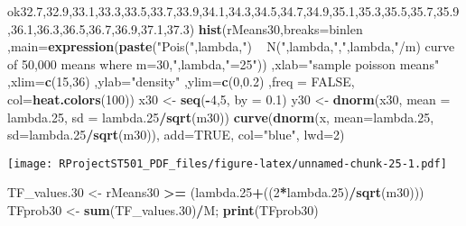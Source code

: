 \documentclass[
]{article}
\newenvironment{Shaded}{\begin{snugshade}}{\end{snugshade}}
\newcommand{\DataTypeTok}[1]{\textcolor[rgb]{0.13,0.29,0.53}{#1}}
\newcommand{\DecValTok}[1]{\textcolor[rgb]{0.00,0.00,0.81}{#1}}
\newcommand{\FloatTok}[1]{\textcolor[rgb]{0.00,0.00,0.81}{#1}}
\newcommand{\KeywordTok}[1]{\textcolor[rgb]{0.13,0.29,0.53}{\textbf{#1}}}
\newcommand{\NormalTok}[1]{#1}
\newcommand{\OperatorTok}[1]{\textcolor[rgb]{0.81,0.36,0.00}{\textbf{#1}}}
\newcommand{\OtherTok}[1]{\textcolor[rgb]{0.56,0.35,0.01}{#1}}
\newcommand{\StringTok}[1]{\textcolor[rgb]{0.31,0.60,0.02}{#1}}
\begin{document}
\begin{Shaded}
\begin{Highlighting}[]
ok{32.7}\NormalTok{,}\FloatTok{32.9}\NormalTok{,}\FloatTok{33.1}\NormalTok{,}\FloatTok{33.3}\NormalTok{,}\FloatTok{33.5}\NormalTok{,}\FloatTok{33.7}\NormalTok{,}\FloatTok{33.9}\NormalTok{,}\FloatTok{34.1}\NormalTok{,}\FloatTok{34.3}\NormalTok{,}\FloatTok{34.5}\NormalTok{,}\FloatTok{34.7}\NormalTok{,}\FloatTok{34.9}\NormalTok{,}\FloatTok{35.1}\NormalTok{,}\FloatTok{35.3}\NormalTok{,}\FloatTok{35.5}\NormalTok{,}\FloatTok{35.7}\NormalTok{,}\FloatTok{35.9}\NormalTok{,}\FloatTok{36.1}\NormalTok{,}\FloatTok{36.3}\NormalTok{,}\FloatTok{36.5}\NormalTok{,}\FloatTok{36.7}\NormalTok{,}\FloatTok{36.9}\NormalTok{,}\FloatTok{37.1}\NormalTok{,}\FloatTok{37.3}\NormalTok{)}
\KeywordTok{hist}\NormalTok{(rMeans30,}\DataTypeTok{breaks=}\NormalTok{binlen ,}\DataTypeTok{main=}\KeywordTok{expression}\NormalTok{(}\KeywordTok{paste}\NormalTok{(}\StringTok{"Pois("}\NormalTok{,lambda,}\StringTok{") ~ N("}\NormalTok{,lambda,}\StringTok{","}\NormalTok{,lambda,}\StringTok{"/m) curve of 50,000 means where m=30,"}\NormalTok{,lambda,}\StringTok{"=25"}\NormalTok{))  ,}\DataTypeTok{xlab=}\StringTok{"sample poisson means"}\NormalTok{ ,}\DataTypeTok{xlim=}\KeywordTok{c}\NormalTok{(}\DecValTok{15}\NormalTok{,}\DecValTok{36}\NormalTok{) }
\NormalTok{     ,}\DataTypeTok{ylab=}\StringTok{"density"}\NormalTok{ ,}\DataTypeTok{ylim=}\KeywordTok{c}\NormalTok{(}\DecValTok{0}\NormalTok{,}\FloatTok{0.2}\NormalTok{) ,}\DataTypeTok{freq =} \OtherTok{FALSE}\NormalTok{, }\DataTypeTok{col=}\KeywordTok{heat.colors}\NormalTok{(}\DecValTok{100}\NormalTok{))}
\NormalTok{x30 <-}\StringTok{ }\KeywordTok{seq}\NormalTok{(}\OperatorTok{-}\DecValTok{4}\NormalTok{,}\DecValTok{5}\NormalTok{, }\DataTypeTok{by =} \FloatTok{0.1}\NormalTok{)}
\NormalTok{y30 <-}\StringTok{ }\KeywordTok{dnorm}\NormalTok{(x30, }\DataTypeTok{mean =}\NormalTok{ lambda}\FloatTok{.25}\NormalTok{, }\DataTypeTok{sd =}\NormalTok{ lambda}\FloatTok{.25}\OperatorTok{/}\KeywordTok{sqrt}\NormalTok{(m30))}
\KeywordTok{curve}\NormalTok{(}\KeywordTok{dnorm}\NormalTok{(x, }\DataTypeTok{mean=}\NormalTok{lambda}\FloatTok{.25}\NormalTok{, }\DataTypeTok{sd=}\NormalTok{lambda}\FloatTok{.25}\OperatorTok{/}\KeywordTok{sqrt}\NormalTok{(m30)), }\DataTypeTok{add=}\OtherTok{TRUE}\NormalTok{, }\DataTypeTok{col=}\StringTok{"blue"}\NormalTok{, }\DataTypeTok{lwd=}\DecValTok{2}\NormalTok{)}
\end{Highlighting}
\end{Shaded}

\texttt{[image: RProjectST501\_PDF\_files/figure-latex/unnamed-chunk-25-1.pdf]}

\begin{Shaded}
\begin{Highlighting}[]
\NormalTok{TF_values}\FloatTok{.30}\NormalTok{ <-}\StringTok{ }\NormalTok{rMeans30 }\OperatorTok{>=}\StringTok{ }\NormalTok{(lambda}\FloatTok{.25}\OperatorTok{+}\NormalTok{((}\DecValTok{2}\OperatorTok{*}\NormalTok{lambda}\FloatTok{.25}\NormalTok{)}\OperatorTok{/}\KeywordTok{sqrt}\NormalTok{(m30)))}
\NormalTok{TFprob30 <-}\StringTok{ }\KeywordTok{sum}\NormalTok{(TF_values}\FloatTok{.30}\NormalTok{)}\OperatorTok{/}\NormalTok{M; }\KeywordTok{print}\NormalTok{(TFprob30)}
\end{Highlighting}
\end{Shaded}
\end{document}
